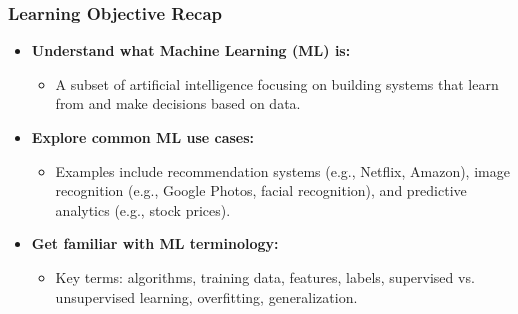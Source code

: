 \documentclass[aspectratio=169]{beamer}
\begin{document}
\begin{frame}[fragile]
    \frametitle{Learning Objective Recap}
    \begin{itemize}
        \item \textbf{Understand what Machine Learning (ML) is:} 
            \begin{itemize}
                \item A subset of artificial intelligence focusing on building systems that learn from and make decisions based on data.
            \end{itemize}
        \item \textbf{Explore common ML use cases:} 
            \begin{itemize}
                \item Examples include recommendation systems (e.g., Netflix, Amazon), image recognition (e.g., Google Photos, facial recognition), and predictive analytics (e.g., stock prices).
            \end{itemize}
        \item \textbf{Get familiar with ML terminology:}
            \begin{itemize}
                \item Key terms: algorithms, training data, features, labels, supervised vs. unsupervised learning, overfitting, generalization.
            \end{itemize}
    \end{itemize}
\end{frame}
\end{document}
